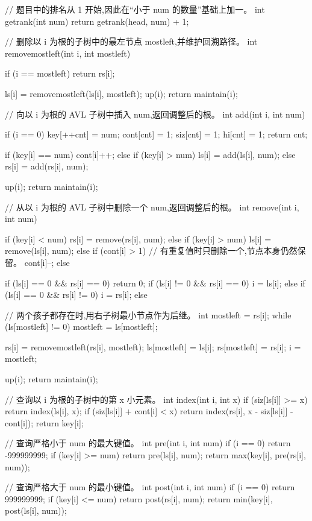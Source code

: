 \documentclass[UTF8,a4paper,11pt]{ctexart}
\begin{document}
\begin{CodeBlock}
// 题目中的排名从 1 开始,因此在“小于 num 的数量”基础上加一。
int getrank(int num) {
    return getrank(head, num) + 1;
}

// 删除以 i 为根的子树中的最左节点 mostleft,并维护回溯路径。
int removemostleft(int i, int mostleft) {
    if (i == mostleft)
        return rs[i];

    ls[i] = removemostleft(ls[i], mostleft);
    up(i);
    return maintain(i);
}

// 向以 i 为根的 AVL 子树中插入 num,返回调整后的根。
int add(int i, int num) {
    if (i == 0) {
        key[++cnt] = num;
        cont[cnt] = 1;
        siz[cnt] = 1;
        hi[cnt] = 1;
        return cnt;
    }

    if (key[i] == num)
        cont[i]++;
    else if (key[i] > num)
        ls[i] = add(ls[i], num);
    else
        rs[i] = add(rs[i], num);

    up(i);
    return maintain(i);
}

// 从以 i 为根的 AVL 子树中删除一个 num,返回调整后的根。
int remove(int i, int num) {
    if (key[i] < num) {
        rs[i] = remove(rs[i], num);
    } else if (key[i] > num) {
        ls[i] = remove(ls[i], num);
    } else if (cont[i] > 1) {
        // 有重复值时只删除一个,节点本身仍然保留。
        cont[i]--;
    } else {
        if (ls[i] == 0 && rs[i] == 0)
            return 0;
        if (ls[i] != 0 && rs[i] == 0)
            i = ls[i];
        else if (ls[i] == 0 && rs[i] != 0)
            i = rs[i];
        else {
            // 两个孩子都存在时,用右子树最小节点作为后继。
            int mostleft = rs[i];
            while (ls[mostleft] != 0)
                mostleft = ls[mostleft];

            rs[i] = removemostleft(rs[i], mostleft);
            ls[mostleft] = ls[i];
            rs[mostleft] = rs[i];
            i = mostleft;
        }
    }

    up(i);
    return maintain(i);
}

// 查询以 i 为根的子树中的第 x 小元素。
int index(int i, int x) {
    if (siz[ls[i]] >= x)
        return index(ls[i], x);
    if (siz[ls[i]] + cont[i] < x)
        return index(rs[i], x - siz[ls[i]] - cont[i]);
    return key[i];
}

// 查询严格小于 num 的最大键值。
int pre(int i, int num) {
    if (i == 0)
        return -999999999;
    if (key[i] >= num)
        return pre(ls[i], num);
    return max(key[i], pre(rs[i], num));
}

// 查询严格大于 num 的最小键值。
int post(int i, int num) {
    if (i == 0)
        return 999999999;
    if (key[i] <= num)
        return post(rs[i], num);
    return min(key[i], post(ls[i], num));
}


\end{CodeBlock}
\end{document}
